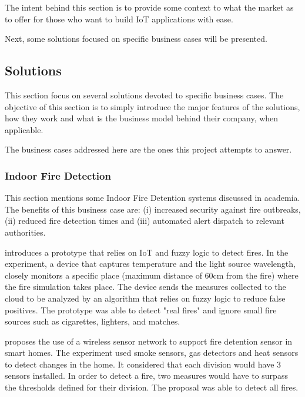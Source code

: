 The intent behind this section is to provide some context to what the market as to offer for those who want to build \gls{IoT} applications with ease.

Next, some solutions focused on specific business cases will be presented.

\subsection{Solutions}
\label{subsec:stateofart:arch:solutions}

This section focus on several solutions devoted to specific business cases.
The objective of this section is to simply introduce the major features of the solutions, how they work and what is the business model behind their company, when applicable.

The business cases addressed here are the ones this project attempts to answer.

\subsubsection{Indoor Fire Detection}
\label{subsubsec:stateofart:arch:solutions:fire}

This section mentions some Indoor Fire Detention systems discussed in academia. The benefits of this business case are: (i) increased security against fire outbreaks, (ii) reduced fire detection times and (iii) automated alert dispatch to relevant authorities.  

\cite{listyorini2018prototype} introduces a prototype that relies on \gls{IoT} and fuzzy logic to detect fires. In the experiment, a device that captures temperature and the light source wavelength, closely monitors a specific place (maximum distance of 60cm from the fire) where the fire simulation takes place. The device sends the measures collected to the cloud to be analyzed by an algorithm that relies on fuzzy logic to reduce false positives. The prototype was able to detect "real fires" and ignore small fire sources such as cigarettes, lighters, and matches. 

\cite{saeed2018iot} proposes the use of a wireless sensor network to support fire detention sensor in smart homes. The experiment used smoke sensors, gas detectors and heat sensors to detect changes in the home. It considered that each division would have 3 sensors installed. In order to detect a fire, two measures would have to surpass the thresholds defined for their division. The proposal was able to detect all fires.

